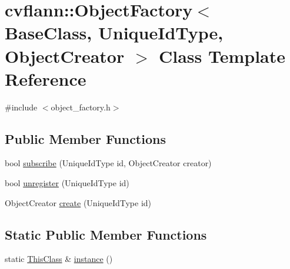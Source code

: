 \hypertarget{classcvflann_1_1ObjectFactory}{\section{cvflann\-:\-:Object\-Factory$<$ Base\-Class, Unique\-Id\-Type, Object\-Creator $>$ Class Template Reference}
\label{classcvflann_1_1ObjectFactory}
}


{\ttfamily \#include $<$object\-\_\-factory.\-h$>$}

\subsection*{Public Member Functions}
\begin{DoxyCompactItemize}
\item 
bool \hyperlink{classcvflann_1_1ObjectFactory_add03343ed57eb5e0da90ab6913a55881}{subscribe} (Unique\-Id\-Type id, Object\-Creator creator)
\item 
bool \hyperlink{classcvflann_1_1ObjectFactory_a35018272e906e5701464dee1aca5539a}{unregister} (Unique\-Id\-Type id)
\item 
Object\-Creator \hyperlink{classcvflann_1_1ObjectFactory_acf829cf48b1f703ef6a86c635486aa64}{create} (Unique\-Id\-Type id)
\end{DoxyCompactItemize}
\subsection*{Static Public Member Functions}
\begin{DoxyCompactItemize}
\item 
static \hyperlink{classcvflann_1_1ObjectFactory}{This\-Class} \& \hyperlink{classcvflann_1_1ObjectFactory_a55a40266663ab28e4728da6f98881968}{instance} ()
\end{DoxyCompactItemize}


